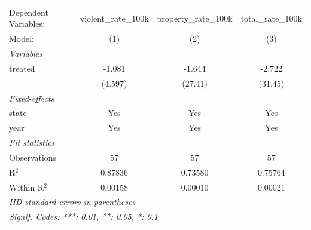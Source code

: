 
\begingroup
\centering
\begin{tabular}{lccc}
   \tabularnewline \midrule \midrule
   Dependent Variables: & violent\_rate\_100k   & property\_rate\_100k   & total\_rate\_100k\\    
   Model:               & (1)                   & (2)                    & (3)\\  
   \midrule
   \emph{Variables}\\
   treated              & -1.081                & -1.644                 & -2.722\\   
                        & (4.597)               & (27.41)                & (31.45)\\   
   \midrule
   \emph{Fixed-effects}\\
   state                & Yes                   & Yes                    & Yes\\  
   year                 & Yes                   & Yes                    & Yes\\  
   \midrule
   \emph{Fit statistics}\\
   Observations         & 57                    & 57                     & 57\\  
   R$^2$                & 0.87836               & 0.73580                & 0.75764\\  
   Within R$^2$         & 0.00158               & 0.00010                & 0.00021\\  
   \midrule \midrule
   \multicolumn{4}{l}{\emph{IID standard-errors in parentheses}}\\
   \multicolumn{4}{l}{\emph{Signif. Codes: ***: 0.01, **: 0.05, *: 0.1}}\\
\end{tabular}
\par\endgroup


